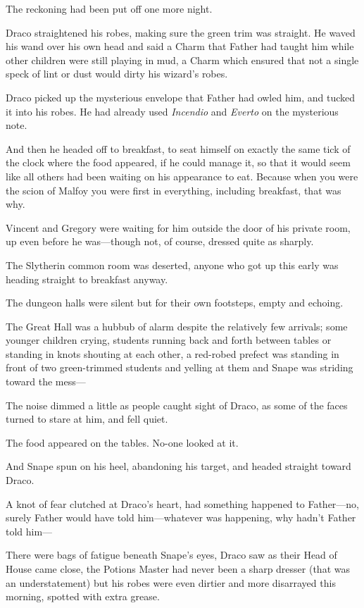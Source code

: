 The reckoning had been put off one more night.


Draco straightened his robes, making sure the green trim was straight. He waved his wand over his own head and said a Charm that Father had taught him while other children were still playing in mud, a Charm which ensured that not a single speck of lint or dust would dirty his wizard's robes.

Draco picked up the mysterious envelope that Father had owled him, and tucked it into his robes. He had already used \emph{Incendio} and \emph{Everto} on the mysterious note.

And then he headed off to breakfast, to seat himself on exactly the same tick of the clock where the food appeared, if he could manage it, so that it would seem like all others had been waiting on his appearance to eat. Because when you were the scion of Malfoy you were first in everything, including breakfast, that was why.

Vincent and Gregory were waiting for him outside the door of his private room, up even before he was—though not, of course, dressed quite as sharply.

The Slytherin common room was deserted, anyone who got up this early was heading straight to breakfast anyway.

The dungeon halls were silent but for their own footsteps, empty and echoing.

The Great Hall was a hubbub of alarm despite the relatively few arrivals; some younger children crying, students running back and forth between tables or standing in knots shouting at each other, a red-robed prefect was standing in front of two green-trimmed students and yelling at them and Snape was striding toward the mess—

The noise dimmed a little as people caught sight of Draco, as some of the faces turned to stare at him, and fell quiet.

The food appeared on the tables. No-one looked at it.

And Snape spun on his heel, abandoning his target, and headed straight toward Draco.

A knot of fear clutched at Draco's heart, had something happened to Father—no, surely Father would have told him—whatever was happening, why hadn't Father told him—

There were bags of fatigue beneath Snape's eyes, Draco saw as their Head of House came close, the Potions Master had never been a sharp dresser (that was an understatement) but his robes were even dirtier and more disarrayed this morning, spotted with extra grease.

